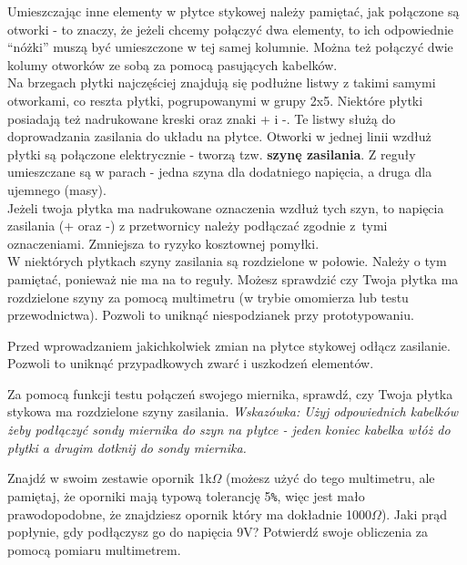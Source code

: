 \documentclass{pdfBooklets}
\begin{document}
Umieszczając inne elementy w płytce stykowej należy pamiętać, jak połączone są otworki - to znaczy, że jeżeli chcemy
połączyć dwa elementy, to ich odpowiednie ``nóżki'' muszą być umieszczone w tej samej kolumnie. Można też połączyć dwie kolumy otworków
ze sobą za pomocą pasujących kabelków.
\\

Na brzegach płytki najczęściej znajdują się podłużne listwy z takimi samymi otworkami, co reszta płytki, pogrupowanymi w grupy 2x5.
Niektóre płytki posiadają też nadrukowane kreski oraz znaki + i -. Te listwy służą do doprowadzania
zasilania do układu na płytce. Otworki w jednej linii wzdłuż płytki są połączone elektrycznie - tworzą tzw.
\textbf{szynę zasilania}. Z reguły umieszczane są w parach - jedna szyna dla dodatniego napięcia, a druga dla ujemnego (masy).\\

Jeżeli twoja płytka ma nadrukowane oznaczenia wzdłuż tych szyn, to napięcia zasilania (+ oraz -) z przetwornicy należy podłączać zgodnie z~tymi
oznaczeniami. Zmniejsza to ryzyko kosztownej pomyłki.\\

W niektórych płytkach szyny zasilania są rozdzielone w połowie. Należy o tym pamiętać, ponieważ nie ma na to reguły.
Możesz sprawdzić czy Twoja płytka ma rozdzielone szyny za pomocą multimetru (w trybie omomierza lub testu przewodnictwa). Pozwoli to uniknąć
niespodzianek przy prototypowaniu.

\begin{ProTip}{}
  Przed wprowadzaniem jakichkolwiek zmian na płytce stykowej odłącz zasilanie. Pozwoli to uniknąć przypadkowych zwarć i uszkodzeń elementów.
\end{ProTip}

\begin{Zadanie}{}{}
  Za pomocą funkcji testu połączeń swojego miernika, sprawdź, czy Twoja płytka stykowa ma rozdzielone szyny zasilania.
  \textit{Wskazówka: Użyj odpowiednich kabelków żeby podłączyć sondy miernika do szyn na płytce - jeden koniec kabelka włóż do płytki a drugim
    dotknij do sondy miernika.}
\end{Zadanie}

\begin{Zadanie}{}{}
  Znajdź w swoim zestawie opornik 1k$\Omega$ (możesz użyć do tego multimetru, ale pamiętaj, że oporniki mają typową tolerancję 5\Verb$%
  więc jest mało prawodopodobne, że znajdziesz opornik który ma dokładnie 1000$\Omega$). Jaki prąd popłynie, gdy podłączysz go do napięcia 9V?
  Potwierdź swoje obliczenia za pomocą pomiaru multimetrem.
\end{Zadanie}
\end{document}
